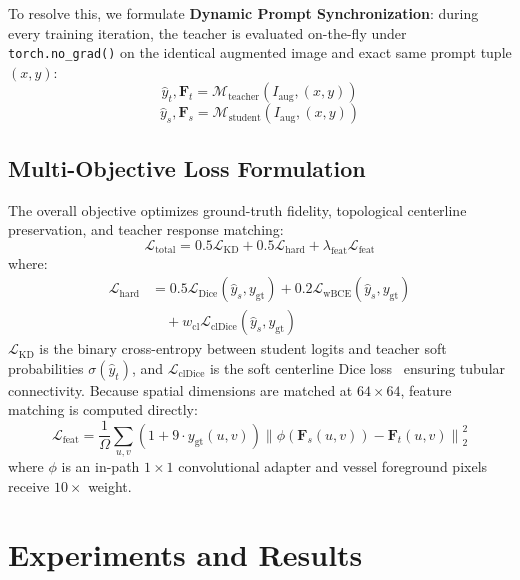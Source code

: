 \documentclass[10pt,twocolumn]{article}
\begin{document}
To resolve this, we formulate \textbf{Dynamic Prompt Synchronization}: during every training iteration, the teacher is evaluated on-the-fly under \texttt{torch.no\_grad()} on the identical augmented image and exact same prompt tuple $(x, y)$:
\begin{equation}
    \hat{y}_t, \mathbf{F}_t = \mathcal{M}_{\text{teacher}}(I_{\text{aug}}, (x, y))
\end{equation}
\begin{equation}
    \hat{y}_s, \mathbf{F}_s = \mathcal{M}_{\text{student}}(I_{\text{aug}}, (x, y))
\end{equation}

\subsection{Multi-Objective Loss Formulation}

The overall objective optimizes ground-truth fidelity, topological centerline preservation, and teacher response matching:
\begin{equation}
    \mathcal{L}_{\text{total}} = 0.5 \mathcal{L}_{\text{KD}} + 0.5 \mathcal{L}_{\text{hard}} + \lambda_{\text{feat}} \mathcal{L}_{\text{feat}}
\end{equation}
where:
\begin{align}
    \mathcal{L}_{\text{hard}} &= 0.5 \mathcal{L}_{\text{Dice}}(\hat{y}_s, y_{\text{gt}}) + 0.2 \mathcal{L}_{\text{wBCE}}(\hat{y}_s, y_{\text{gt}}) \nonumber \\
    &\quad + w_{\text{cl}} \mathcal{L}_{\text{clDice}}(\hat{y}_s, y_{\text{gt}})
\end{align}
$\mathcal{L}_{\text{KD}}$ is the binary cross-entropy between student logits and teacher soft probabilities $\sigma(\hat{y}_t)$, and $\mathcal{L}_{\text{clDice}}$ is the soft centerline Dice loss~\citep{cldice} ensuring tubular connectivity. Because spatial dimensions are matched at $64\times 64$, feature matching is computed directly:
\begin{equation}
    \mathcal{L}_{\text{feat}} = \frac{1}{\Omega} \sum_{u,v} (1 + 9 \cdot y_{\text{gt}}(u,v)) \left\| \phi(\mathbf{F}_s(u,v)) - \mathbf{F}_t(u,v) \right\|_2^2
\end{equation}
where $\phi$ is an in-path $1\times 1$ convolutional adapter and vessel foreground pixels receive $10\times$ weight.

\section{Experiments and Results}
\end{document}
